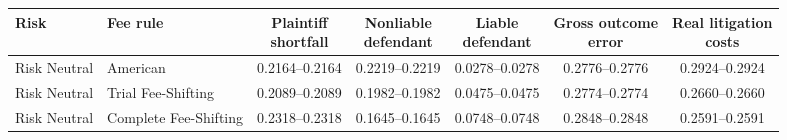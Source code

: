 \documentclass[10pt,border=5pt]{standalone}
\begin{document}
\begin{tabular}{llccccc}
\toprule Risk & Fee rule & \shortstack{Plaintiff\\shortfall} & \shortstack{Nonliable\\defendant} & \shortstack{Liable\\defendant} & \shortstack{Gross outcome\\error} & \shortstack{Real litigation\\costs} \\
\midrule
Risk Neutral & American & 0.2164--0.2164 & 0.2219--0.2219 & 0.0278--0.0278 & 0.2776--0.2776 & 0.2924--0.2924 \\
Risk Neutral & Trial Fee-Shifting & 0.2089--0.2089 & 0.1982--0.1982 & 0.0475--0.0475 & 0.2774--0.2774 & 0.2660--0.2660 \\
Risk Neutral & Complete Fee-Shifting & 0.2318--0.2318 & 0.1645--0.1645 & 0.0748--0.0748 & 0.2848--0.2848 & 0.2591--0.2591 \\
\bottomrule\end{tabular}
\end{document}
